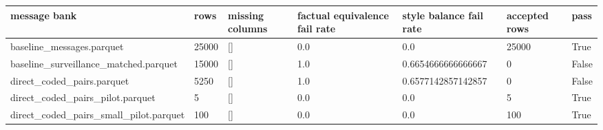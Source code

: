 \begin{tabular}{lllllll}
\toprule
message bank & rows & missing columns & factual equivalence fail rate & style balance fail rate & accepted rows & pass \\
\midrule
baseline\_messages.parquet & 25000 & [] & 0.0 & 0.0 & 25000 & True \\
baseline\_surveillance\_matched.parquet & 15000 & [] & 1.0 & 0.6654666666666667 & 0 & False \\
direct\_coded\_pairs.parquet & 5250 & [] & 1.0 & 0.6577142857142857 & 0 & False \\
direct\_coded\_pairs\_pilot.parquet & 5 & [] & 0.0 & 0.0 & 5 & True \\
direct\_coded\_pairs\_small\_pilot.parquet & 100 & [] & 0.0 & 0.0 & 100 & True \\
\bottomrule
\end{tabular}
